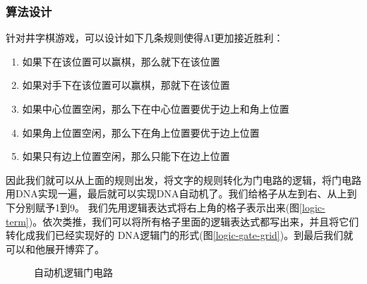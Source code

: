 \documentclass[a4paper,twoside]{article}
\begin{document}
\subsubsection{算法设计}
针对井字棋游戏，可以设计如下几条规则使得AI更加接近胜利：
\begin{enumerate}[itemsep=1.5pt,topsep=0pt,parsep=0pt]
	\item 如果下在该位置可以赢棋，那么就下在该位置
	\item 如果对手下在该位置可以赢棋，那就下在该位置
	\item 如果中心位置空闲，那么下在中心位置要优于边上和角上位置
	\item 如果角上位置空闲，那么下在角上位置要优于边上位置
	\item 如果只有边上位置空闲，那么只能下在边上位置
\end{enumerate}
因此我们就可以从上面的规则出发，将文字的规则转化为门电路的逻辑，将门电路用DNA实现一遍，最后就可以实现DNA自动机了。我们给格子从左到右、从上到下分别赋予1到9。
我们先用逻辑表达式将右上角的格子表示出来(图\ref{logic-term})。依次类推，我们可以将所有格子里面的逻辑表达式都写出来，并且将它们转化成我们已经实现好的
DNA逻辑门的形式(图\ref{logic-gate-grid})。到最后我们就可以和他展开博弈了。
\begin{figure}[htbp]
	\centering
	\caption{自动机逻辑门电路}
\end{figure}
\end{document}
